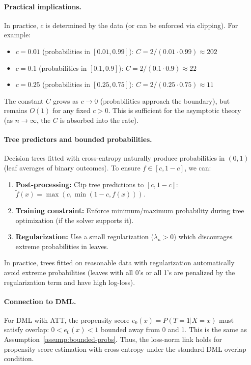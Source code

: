 \documentclass[12pt]{article}
\begin{document}
\paragraph{Practical implications.}
In practice, $c$ is determined by the data (or can be enforced via clipping). For example:
\begin{itemize}
\item $c = 0.01$ (probabilities in $[0.01, 0.99]$): $C = 2/(0.01 \cdot 0.99) \approx 202$
\item $c = 0.1$ (probabilities in $[0.1, 0.9]$): $C = 2/(0.1 \cdot 0.9) \approx 22$
\item $c = 0.25$ (probabilities in $[0.25, 0.75]$): $C = 2/(0.25 \cdot 0.75) \approx 11$
\end{itemize}

The constant $C$ grows as $c \to 0$ (probabilities approach the boundary), but remains $O(1)$ for any fixed $c > 0$. This is sufficient for the asymptotic theory (as $n \to \infty$, the $C$ is absorbed into the rate).

\paragraph{Tree predictors and bounded probabilities.}
Decision trees fitted with cross-entropy naturally produce probabilities in $(0,1)$ (leaf averages of binary outcomes). To ensure $f \in [c, 1-c]$, we can:
\begin{enumerate}
\item \textbf{Post-processing:} Clip tree predictions to $[c, 1-c]$: $\tilde{f}(x) = \max(c, \min(1-c, f(x)))$.
\item \textbf{Training constraint:} Enforce minimum/maximum probability during tree optimization (if the solver supports it).
\item \textbf{Regularization:} Use a small regularization ($\lambda_n > 0$) which discourages extreme probabilities in leaves.
\end{enumerate}

In practice, trees fitted on reasonable data with regularization automatically avoid extreme probabilities (leaves with all 0's or all 1's are penalized by the regularization term and have high log-loss).

\paragraph{Connection to DML.}
For DML with ATT, the propensity score $e_0(x) = P(T=1|X=x)$ must satisfy overlap: $0 < e_0(x) < 1$ bounded away from 0 and 1. This is the same as Assumption~\ref{assump:bounded-probs}. Thus, the loss-norm link holds for propensity score estimation with cross-entropy under the standard DML overlap condition.
\end{document}
